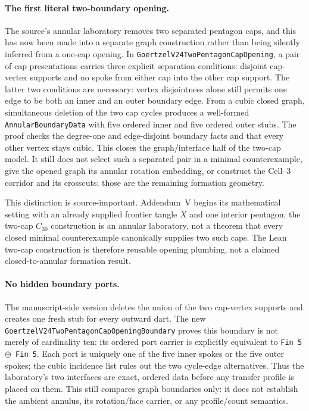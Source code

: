 \documentclass[11pt]{article}
\theoremstyle{definition}
\begin{document}
\paragraph{The first literal two-boundary opening.}
The source's annular laboratory removes two separated pentagon caps, and this
has now been made into a separate graph construction rather than being
silently inferred from a one-cap opening.  In
\texttt{GoertzelV24TwoPentagonCapOpening}, a pair of cap presentations carries
three explicit separation conditions: disjoint cap-vertex supports and no
spoke from either cap into the other cap support.  The latter two conditions
are necessary: vertex disjointness alone still permits one edge to be both an
inner and an outer boundary edge.  From a cubic closed graph, simultaneous
deletion of the two cap cycles produces a well-formed
\texttt{AnnularBoundaryData} with five ordered inner and five ordered outer
stubs.  The proof checks the degree-one and edge-disjoint boundary facts and
that every other vertex stays cubic.  This closes the graph/interface half of
the two-cap model.  It still does not select such a separated pair in a
minimal counterexample, give the opened graph its annular rotation embedding,
or construct the Cell--3 corridor and its crosscuts; those are the remaining
formation geometry.

This distinction is source-important.  Addendum~V begins its mathematical
setting with an already supplied frontier tangle $X$ and one interior
pentagon; the two-cap $C_{30}$ construction is an annular laboratory, not a
theorem that every closed minimal counterexample canonically supplies two
such caps.  The Lean two-cap construction is therefore reusable opening
plumbing, not a claimed closed-to-annular formation result.

\paragraph{No hidden boundary ports.}
The manuscript-side version deletes the union of the two cap-vertex supports
and creates one fresh stub for every outward dart.  The new
\texttt{GoertzelV24TwoPentagonCapOpeningBoundary} proves this boundary is
not merely of cardinality ten: its ordered port carrier is explicitly
equivalent to \texttt{Fin 5 $\oplus$ Fin 5}.  Each port is uniquely one of the
five inner spokes or the five outer spokes; the cubic incidence list rules
out the two cycle-edge alternatives.  Thus the laboratory's two interfaces
are exact, ordered data before any transfer profile is placed on them.  This
still compares graph boundaries only: it does not establish the ambient
annulus, its rotation/face carrier, or any profile/count semantics.
\end{document}
